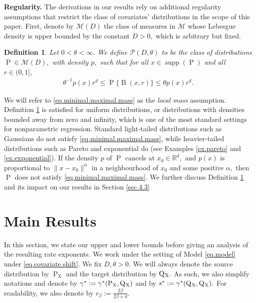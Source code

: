 \documentclass[10pt]{article}
\newcommand{\mM}{\mathcal{M}}
\newcommand{\mP}{\mathcal{P}}
\newcommand{\RR}{\mathbb{R}}
\newcommand{\B}{\operatorname{B}}
\renewcommand{\P}{\operatorname{P}}
\newcommand{\Q}{\operatorname{Q}}
\newcommand{\supp}{\operatorname{supp}}
\newcommand{\sX}{\mathrm{X}}
\newtheorem{definition}[theorem]{Definition}
\begin{document}
\noindent\textbf{Regularity.} The derivations in our results rely on additional regularity assumptions that restrict the class of covariates' distributions in the scope of this paper. First, denote by $\mM(D)$ the class of measures in $\mM$ whose Lebesgue density is upper bounded by the constant $D>0,$ which is arbitrary but fixed.
\begin{definition}
\label{def.class.proba}
Let $0 < \theta < \infty.$ We define $\mP(D, \theta)$ to be the class of distributions $\P \in \mM(D),$ with density $p,$ such that for all $x \in \supp(\P)$ and all $r \in (0, 1],$
\begin{align}
    \label{eq.minimal.maximal.mass}
    \theta^{-1}p(x)r^d \leq \P\{\B(x, r)\} \leq \theta p(x)r^d.
\end{align}
\end{definition}
We will refer to \eqref{eq.minimal.maximal.mass} as the \textit{local mass} assumption. Definition \ref{def.class.proba} is satisfied for uniform distributions, or distributions with densities bounded away from zero and infinity, which is one of the most standard settings for nonparametric regression. Standard light-tailed distributions such as Gaussians do not satisfy \eqref{eq.minimal.maximal.mass}, while heavier-tailed distributions such as Pareto and exponential do (see Examples \ref{ex.pareto} and \ref{ex.exponential}). If the density $p$ of $\P$ cancels at $x_0 \in \RR^d,$ and $p(x)$ is proportional to $\|x - x_0\|^\alpha$ in a neighbourhood of $x_0$ and some positive $\alpha,$ then $\P$ does not satisfy \eqref{eq.minimal.maximal.mass}. We further discuss Definition \ref{def.class.proba} and its impact on our results in Section \ref{sec.4.3}









\section{Main Results} \label{sec.3}
In this section, we state our upper and lower bounds before giving an analysis of the resulting rate exponents. 
We work under the setting of Model \eqref{eq.model} under \eqref{eq.covariate.shift}. We fix $D, \theta > 0.$ We will always denote the source distribution by $\P_{\sX}$ and the target distribution by $\Q\mathstrut_{\!\sX}.$ As such, we also simplify notations and denote by $\gamma^* := \gamma^*(\P_{\sX}, \Q\mathstrut_{\!\sX})$ and by $s^* := \gamma^*(\Q\mathstrut_{\!\sX}, \Q\mathstrut_{\!\sX}).$ For readability, we also denote by $r_\beta := \tfrac{2\beta}{2\beta + d}.$
\end{document}

